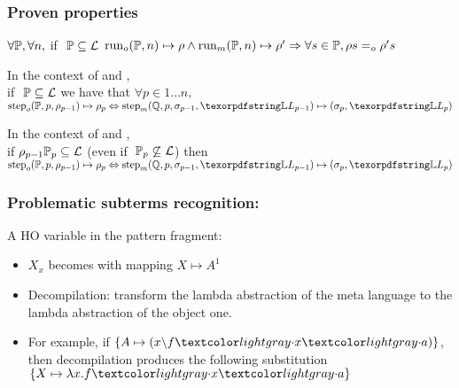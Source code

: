 \documentclass{pres}
\newtheorem{proposition}[theorem]{Proposition}
\begin{document}
\begin{frame}
  \frametitle{Proven properties}

  \begin{description}[]
    \item[Run Equivalence]
    $\forall \mathbb{P}, \forall n,$ if $~\mathbb{P} \subseteq \mathcal{L}$
    $
      {\mathrm{run}}_o(\mathbb{P},n) \mapsto \rho \land
      {\mathrm{run}}_m(\mathbb{P},n) \mapsto \rho'
      \Rightarrow
      \forall s \in \mathbb{P}, \rho s =_o \rho' s
    $
    \item [Simulation fidelity]
    In the context of  \frun and \hrun,\\
    if $~\mathbb{P} \subseteq \mathcal{L}$ we have that
    $\forall p \in 1 \ldots n,$
    $\stepF{\foUnifPb}{p}{\rho_{p-1}}{\rho_p}
    \Leftrightarrow
    \stepH{\hoUnifPb}{p}{\sigma_{p-1}}{\linkStore_{p-1}}{\sigma_p}{\linkStore_p}
    $
    \item[Fidelity ricovery]
    In the context of \frun and \hrun, \\
    if 
    $\rho_{p-1} \mathbb{P}_{p} \subseteq \mathcal{L}$ 
    (even if $\;\mathbb{P}_{p} \not\subseteq \mathcal{L}$)
    then\\
    $
    \stepF{\foUnifPb}{p}{\rho_{p-1}}{\rho_p} \Leftrightarrow
    \stepH{\hoUnifPb}{p}{\sigma_{p-1}}{\linkStore_{p-1}}{\sigma_{p}}{\linkStore_p}
    $
  \end{description}
    
    

\end{frame}

\begin{frame}
  \frametitle{Problematic subterms recognition: \maybebeta}

  A HO variable in the pattern fragment: 
  \begin{itemize}
    \item $X_x$ becomes  with mapping $X \mapsto A^1$
    \item Decompilation: transform the lambda abstraction of the meta language
          to the lambda abstraction of the object one.
    \item For example, if $\{A \mapsto (x\backslash f\appsep x\appsep a)\}$, then decompilation
          produces the following substitution $\{X \mapsto \lambda x.f\appsep x\appsep a\}$
  \end{itemize}

\end{frame}
\end{document}

